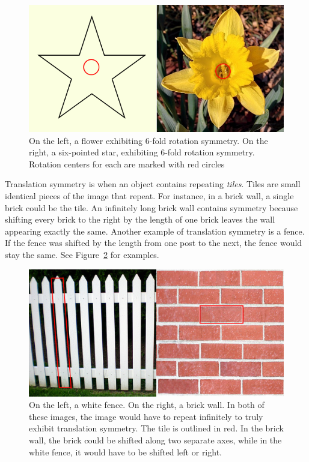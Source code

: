 \begin{figure}
\centering
\includegraphics[width=0.9\columnwidth]{rotation}
\caption{On the left, a flower exhibiting 6-fold rotation symmetry. On the right, a six-pointed star, exhibiting 6-fold rotation symmetry. Rotation centers for each are marked with red circles}
\label{rot}
\end{figure}

Translation symmetry is when an object contains repeating \textit{tiles}. Tiles are small identical pieces of the image that repeat. For instance, in a brick wall, a single brick could be the tile. An infinitely long brick wall contains symmetry because shifting every brick to the right by the length of one brick leaves the wall appearing exactly the same. Another example of translation symmetry is a fence. If the fence was shifted by the length from one post to the next, the fence would stay the same. See Figure~\ref{trans} for examples.

\begin{figure}
\centering
\includegraphics[width=0.9\columnwidth]{translation}
\caption{On the left, a white fence. On the right, a brick wall. In both of these images, the image would have to repeat infinitely to truly exhibit translation symmetry. The tile is outlined in red. In the brick wall, the brick could be shifted along two separate axes, while in the white fence, it would have to be shifted left or right.}
\label{trans}
\end{figure}

